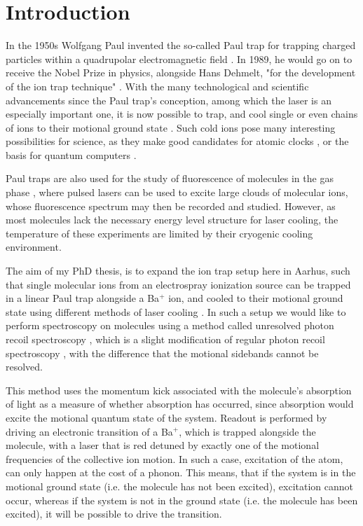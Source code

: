 
\chapter{Introduction}
\label{chap:intro}
In the 1950s Wolfgang Paul invented the so-called Paul trap for trapping charged particles within a quadrupolar electromagnetic field \cite{PaulTrap}. In 1989, he would go on
 to receive the Nobel Prize in physics, alongside Hans Dehmelt, "for the development of the ion trap technique" \cite{NobelPrize.org}.
 With the many technological and scientific advancements since the Paul trap's conception, among which the laser is an especially important one,
 it is now possible to trap, and cool single or even chains of ions to their motional ground state \cite{WinelandSideband,MonroeChain,WinelandChain}.
 Such cold ions pose many interesting possibilities for science, as they make good candidates for atomic clocks \cite{King2022,ClockWineland,PTBClock},
 or the basis for quantum computers \cite{ZiracZoller,Kielpinski2002}.

Paul traps are also used for the study of fluorescence of molecules in the gas phase \cite{Kjaer2021-lm,Gas1},
where pulsed lasers can be used to excite large clouds of molecular ions, whose fluorescence spectrum may then be recorded and studied.
However, as most molecules lack the necessary energy level structure for laser cooling, the temperature of these experiments are limited by their cryogenic cooling environment.


The aim of my PhD thesis, is to expand the ion trap setup here in Aarhus, such that single molecular ions from an electrospray ionization source \cite{FennEsi} can be trapped in a linear Paul trap alongside a Ba$^+$ ion, and cooled to their motional ground state using different methods of laser cooling \cite{WinelandSideband,WinelandLaserCool,StefanSympa}.
In such a setup we would like to perform spectroscopy on molecules using a method called unresolved photon recoil spectroscopy \cite{PRS}, which is a slight modification of regular photon recoil spectroscopy \cite{Recoil1,Recoil2}, with the difference that the motional sidebands cannot be resolved.

This method uses the momentum kick associated with the molecule's absorption of light
as a measure of whether absorption has occurred, since absorption would excite the motional quantum state of the system. Readout is performed by driving an electronic transition of a Ba$^+$, which is trapped alongside the molecule, with a laser that is red detuned by exactly one of the motional frequencies of the collective ion motion. In such a case, excitation of the atom, can only happen at the cost of a phonon. This means, that if the system is in the motional ground state (i.e. the molecule has not been excited), excitation cannot occur, whereas if the system is not in the ground state (i.e. the molecule has been excited), it will be possible to drive the transition.


